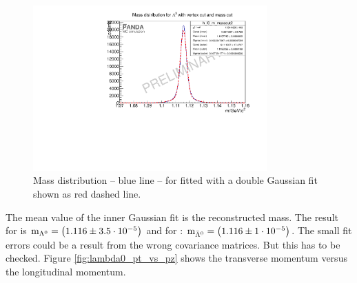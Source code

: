 		\begin{figure}
			\centering
				\includegraphics[width=0.8\textwidth]{./plots/lambda0/lambda0_m_masscut2.pdf}
			\caption{\propose Mass distribution -- blue line -- for \lam fitted with a double Gaussian fit shown as red dashed line.}
			\label{fig:lambda0_massfit}
		\end{figure}
		
		The mean value of the inner Gaussian fit is the reconstructed mass.
		The result for \lam is $\textnormal{m}_{\Lambda^0} = \left(1.116 \pm 3.5\cdot 10^{-5}\right)$ \massunit and for \alam: $\textnormal{m}_{\bar{\Lambda}^0} = \left(1.116 \pm 1\cdot 10^{-5}\right)$\massunit. 
		The small fit errors could be a result from the wrong covariance matrices. 
		But this has to be checked. 
		Figure \ref{fig:lambda0_pt_vs_pz} shows the transverse momentum versus the longitudinal momentum.
				
